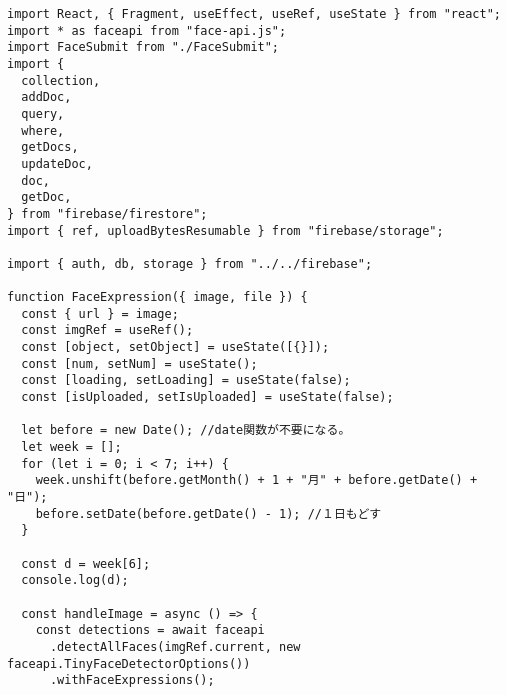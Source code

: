 \begin{verbatim}
import React, { Fragment, useEffect, useRef, useState } from "react";
import * as faceapi from "face-api.js";
import FaceSubmit from "./FaceSubmit";
import {
  collection,
  addDoc,
  query,
  where,
  getDocs,
  updateDoc,
  doc,
  getDoc,
} from "firebase/firestore";
import { ref, uploadBytesResumable } from "firebase/storage";

import { auth, db, storage } from "../../firebase";

function FaceExpression({ image, file }) {
  const { url } = image;
  const imgRef = useRef();
  const [object, setObject] = useState([{}]);
  const [num, setNum] = useState();
  const [loading, setLoading] = useState(false);
  const [isUploaded, setIsUploaded] = useState(false);

  let before = new Date(); //date関数が不要になる。
  let week = [];
  for (let i = 0; i < 7; i++) {
    week.unshift(before.getMonth() + 1 + "月" + before.getDate() + "日");
    before.setDate(before.getDate() - 1); //１日もどす
  }

  const d = week[6];
  console.log(d);

  const handleImage = async () => {
    const detections = await faceapi
      .detectAllFaces(imgRef.current, new faceapi.TinyFaceDetectorOptions())
      .withFaceExpressions();


\end{verbatim}
